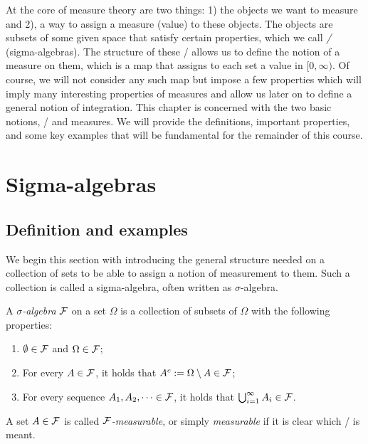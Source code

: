 
%


At the core of measure theory are two things: 1) the objects we want to measure and 2), a way to assign a measure (value) to these objects. The objects are subsets of some given space that satisfy certain properties, which we call \emph{\sigalgs/} (sigma-algebras). The structure of these \sigalgs/ allows us to define the notion of a measure on them, which is a map that assigns to each set a value in $[0,\infty)$. Of course, we will not consider any such map but impose a few properties which will imply many interesting properties of measures and allow us later on to define a general notion of integration. This chapter is concerned with the two basic notions, \sigalgs/ and measures. We will provide the definitions, important properties, and some key examples that will be fundamental for the remainder of this course.


\section{Sigma-algebras}



\subsection{Definition and examples}

We begin this section with introducing the general structure needed on a collection of sets to be able to assign a notion of measurement to them. Such a collection is called a sigma-algebra, often written as $\sigma$-algebra.

\begin{definition}\label{def:sigma_algebra}
A \emph{$\sigma$-algebra} $\mathcal F$ on a set $\Omega$ is a collection of subsets of $\Omega$ with the following properties:
\begin{enumerate}
\item $\emptyset \in \mathcal F$ and $\Omega \in \mathcal F$;
\item For every $A \in \mathcal F$, it holds that $A^c := \Omega \setminus A \in \mathcal F$;
\item For every sequence $A_1, A_2, \dots \in \mathcal F$, it holds that $\bigcup_{i = 1}^\infty A_i \in \mathcal F$.
\end{enumerate}
A set $A \in \mathcal F$ is called \emph{$\mathcal F$-measurable}, or simply \emph{measurable} if it is clear which \sigalg/ is meant.
\end{definition}

